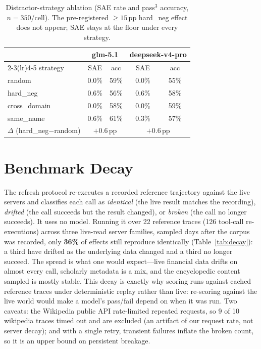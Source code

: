 \begin{table}[t]
  \centering \small
  \begin{tabular}{lcccc}
    \toprule
    & \multicolumn{2}{c}{glm-5.1} & \multicolumn{2}{c}{deepseek-v4-pro} \\
    \cmidrule(lr){2-3}\cmidrule(lr){4-5}
    strategy & SAE & acc & SAE & acc \\
    \midrule
    \textsf{random}       & 0.0\% & 59\% & 0.0\% & 55\% \\
    \textsf{hard\_neg}    & 0.6\% & 56\% & 0.6\% & 58\% \\
    \textsf{cross\_domain}& 0.0\% & 58\% & 0.0\% & 59\% \\
    \textsf{same\_name}   & 0.6\% & 61\% & 0.3\% & 57\% \\
    \midrule
    $\Delta$ (\textsf{hard\_neg}$-$\textsf{random}) & \multicolumn{2}{c}{$+0.6$\,pp} & \multicolumn{2}{c}{$+0.6$\,pp} \\
    \bottomrule
  \end{tabular}
  \caption{Distractor-strategy ablation (SAE rate and pass$^3$ accuracy,
    $n{=}350$/cell). The pre-registered $\ge 15$\,pp \textsf{hard\_neg} effect
    does not appear; SAE stays at the floor under every strategy.}
  \label{tab:distractor}
\end{table}

\section{Benchmark Decay}
\label{app:decay}
The refresh protocol re-executes a recorded reference trajectory against the
live servers and classifies each call as \emph{identical} (the live result
matches the recording), \emph{drifted} (the call succeeds but the result
changed), or \emph{broken} (the call no longer succeeds). It uses no model.
Running it over 22 reference traces (126 tool-call re-executions) across three
live-read server families, sampled days after the corpus was recorded, only
\textbf{36\%} of effects still reproduce identically (Table~\ref{tab:decay}): a
third have drifted as the underlying data changed and a third no longer succeed.
The spread is what one would expect---live financial data drifts on almost every
call, scholarly metadata is a mix, and the encyclopedic content sampled is
mostly stable. This decay is exactly why scoring runs against cached reference
traces under deterministic replay rather than live: re-scoring against the live
world would make a model's pass/fail depend on when it was run. Two caveats: the
Wikipedia public API rate-limited repeated requests, so 9 of 10 wikipedia traces
timed out and are excluded (an artifact of our request rate, not server decay);
and with a single retry, transient failures inflate the broken count, so it is
an upper bound on persistent breakage.

